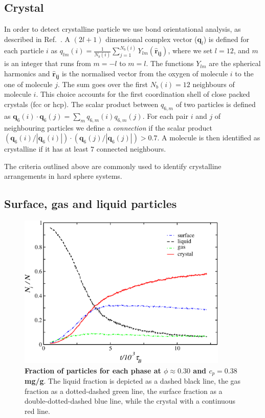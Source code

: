 \subsection*{Crystal}
In order to detect crystalline particle we use bond orientational analysis,
as described in Ref.~\cite{russo2013interplay}.
A $(2l+1)$ dimensional complex vector ($\mathbf{q}_l$) is defined for each
particle $i$ as $q_{lm}(i)=\frac{1}{N_b(i)}\sum_{j=1}^{N_b(i)}
Y_{lm}(\mathbf{\hat{r}_{ij}})$, where we set $l=12$, and $m$ is an integer that
runs from $m=-l$ to $m=l$. The functions $Y_{lm}$ are the spherical harmonics
and $\mathbf{\hat{r}_{ij}}$ is the normalised vector from the oxygen of
molecule $i$ to the one of molecule $j$.  The sum goes over the first
$N_b(i)=12$ neighbours of molecule $i$. This choice accounts for
the first coordination shell of close packed crystals (fcc or hcp).
The scalar product between $q_{6,m}$ of two particles
is defined as $\mathbf{q}_{6}(i)\cdot\mathbf{q}_{6}(j)=\sum_m q_{6,m}(i)q_{6,m}(j)$.
For each pair $i$ and $j$ of neighbouring particles we define a \emph{connection}
if the scalar product $(\mathbf{q}_{6}(i)/|\mathbf{q}_{6}(i)|)\cdot(\mathbf{q}_{6}(j)/|\mathbf{q}_{6}(j)|)>0.7$.
A molecule is then identified as crystalline if it has at least $7$ connected neighbours.

The criteria outlined above are commonly used to identify crystalline arrangements in hard sphere systems.

\subsection*{Surface, gas and liquid particles}

\begin{figure}[!b]
 \centering
 \includegraphics[width=10cm]{./fractions.pdf}
 \caption{{\bf Fraction of particles for each phase at $\phi\approx 0.30$ and $c_p=0.38$ mg/g}. The liquid
 fraction is depicted as a dashed black line, the gas fraction as a dotted-dashed green line, the surface
 fraction as a double-dotted-dashed blue line, while the crystal with a continuous red line.}
 \label{fig:fractions}
\end{figure}

